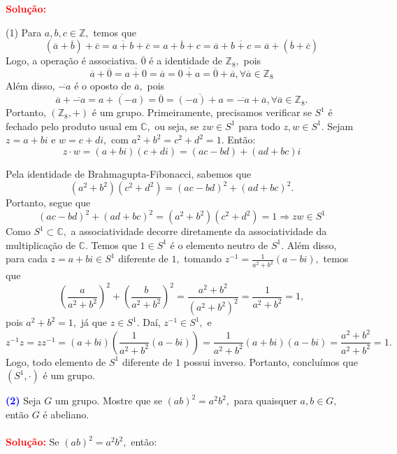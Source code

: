 \documentclass[12pt, a4paper]{article}
\newcommand{\negrito}[1]{\mbox{\boldmath{$#1$}}}
\begin{document}
\textbf{\textcolor{red}{Solução:}} 
\begin{tasks}[counter-format={(tsk[a])},label-width=3.6ex, label-format = {\bfseries}, column-sep = {0pt}](1)
\task[\textcolor{Floresta}{$\negrito{(a)} $}] Para $a,b,c \in \mathbb{Z},$ temos que
\[
(\overline{a} + \overline{b}) + \overline{c} = \overline{a+b} + \overline{c} = \overline{a+b+c} = \overline{a} + \overline{b+c} = \overline{a} + (\overline{b} + \overline{c})
\]
Logo, a operação é associativa. $\overline{0}$ é a identidade de $\mathbb{Z}_8,$ pois 
\[
\overline{a} + \overline{0} = \overline{a + 0} = \overline{a} = \overline{0 + a} = \overline{0} + \overline{a}, \forall \overline{a} \in \mathbb{Z}_8
\]
Além disso, $\overline{-a}$ é o oposto de $\overline{a},$ pois
\[
\overline{a} + \overline{-a} = \overline{a+(-a)} = \overline{0} = \overline{(-a)+a} = \overline{-a} + \overline{a}, \forall \overline{a} \in \mathbb{Z}_8.
\]
Portanto, $(\mathbb{Z}_8, +)$ é um grupo.
\task[\textcolor{Floresta}{$\negrito{(b)} $}] Primeiramente, precisamos verificar se $S^1$ é fechado pelo produto usual em $\mathbb{C},$ ou seja, se $zw \in S^1$ para todo $z, w \in S^1.$ Sejam $z = a + bi$ e $w = c + di,$ com $a^2 + b^2 = c^2 + d^2 = 1.$ Então:
\[
z \cdot w = (a+bi)(c+di) =  (ac-bd) + (ad+bc)i
\]

Pela identidade de Brahmagupta-Fibonacci, sabemos que
\[
(a^2 + b^2)(c^2 + d^2) = (ac-bd)^2 + (ad+bc)^2.
\]
Portanto, segue que
\[
(ac-bd)^2 + (ad+bc)^2 = (a^2 + b^2)(c^2 + d^2) = 1 \Rightarrow zw \in S^1
\]
Como $S^1 \subset \mathbb{C},$ a associatividade decorre diretamente da associatividade da multiplicação de $\mathbb{C}.$ Temos que $1 \in S^1$ é o elemento neutro de $S^1.$ Além disso, para cada $z = a + bi \in S^1$ diferente de $1,$ tomando $z^{-1} = \frac{1}{a^2 + b^2}(a - bi),$ temos que
\[
\left(\frac{a}{a^2 + b^2}\right)^2 + \left(\frac{b}{a^2 + b^2}\right)^2 = \frac{a^2 + b^2}{(a^2 + b^2)^2} = \frac{1}{a^2 + b^2} = 1,
\]
pois $a^2 + b^2 = 1,$ já que $z \in S^1.$ Daí, $z^{-1} \in S^1,$ e
\[
z^{-1}z = zz^{-1} = (a+bi)\left(\frac{1}{a^2 + b^2}(a - bi)\right) = \frac{1}{a^2 + b^2}(a+bi)(a-bi) = \frac{a^2 + b^2}{a^2 + b^2} = 1.
\]
Logo, todo elemento de $S^1$ diferente de $1$ possui inverso.
Portanto, concluímos que $(S^1, \cdot)$ é um grupo.
\end{tasks}
\textcolor{blue}{\bf(2)}\label{2} Seja $G$ um grupo. Mostre que se $(ab)^2 = a^2b^2,$ para quaisquer $a,b \in G,$ então $G$ é abeliano.\\ \\
\textbf{\textcolor{red}{Solução:}} Se $(ab)^2 = a^2b^2,$ então:
\end{document}
